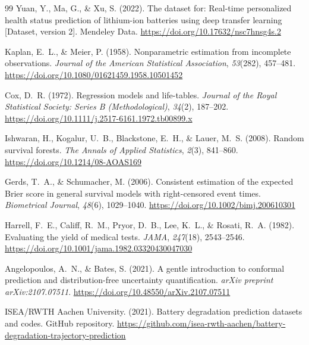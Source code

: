 \documentclass[preprint,12pt]{elsarticle}
\begin{document}
\begin{thebibliography}{99}
Yuan, Y., Ma, G., \& Xu, S. (2022). The dataset for: Real-time personalized health status prediction of lithium-ion batteries using deep transfer learning [Dataset, version 2]. Mendeley Data. \url{https://doi.org/10.17632/nsc7hnsg4s.2}

Kaplan, E.~L., \& Meier, P. (1958). Nonparametric estimation from incomplete observations. \textit{Journal of the American Statistical Association}, \textit{53}(282), 457--481. \url{https://doi.org/10.1080/01621459.1958.10501452}

Cox, D.~R. (1972). Regression models and life-tables. \textit{Journal of the Royal Statistical Society: Series B (Methodological)}, \textit{34}(2), 187--202. \url{https://doi.org/10.1111/j.2517-6161.1972.tb00899.x}

Ishwaran, H., Kogalur, U.~B., Blackstone, E.~H., \& Lauer, M.~S. (2008). Random survival forests. \textit{The Annals of Applied Statistics}, \textit{2}(3), 841--860. \url{https://doi.org/10.1214/08-AOAS169}

Gerds, T.~A., \& Schumacher, M. (2006). Consistent estimation of the expected Brier score in general survival models with right-censored event times. \textit{Biometrical Journal}, \textit{48}(6), 1029--1040. \url{https://doi.org/10.1002/bimj.200610301}

Harrell, F.~E., Califf, R.~M., Pryor, D.~B., Lee, K.~L., \& Rosati, R.~A. (1982). Evaluating the yield of medical tests. \textit{JAMA}, \textit{247}(18), 2543--2546. \url{https://doi.org/10.1001/jama.1982.03320430047030}

Angelopoulos, A.~N., \& Bates, S. (2021). A gentle introduction to conformal prediction and distribution-free uncertainty quantification. \textit{arXiv preprint arXiv:2107.07511}. \url{https://doi.org/10.48550/arXiv.2107.07511}

ISEA/RWTH Aachen University. (2021). Battery degradation prediction datasets and codes. GitHub repository. \url{https://github.com/isea-rwth-aachen/battery-degradation-trajectory-prediction}



\end{thebibliography}
\end{document}
